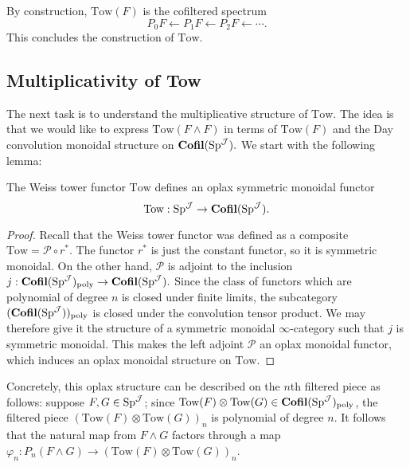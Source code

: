 \begin{cnstr}
By construction, $\text{Tow}(F)$ is the cofiltered spectrum $$P_0 F\longleftarrow P_1 F \longleftarrow P_2 F \longleftarrow \cdots .$$  This concludes the construction of $\text{Tow}.$
\end{cnstr}

\subsection{Multiplicativity of Tow}
The next task is to understand the multiplicative structure of $\text{Tow}$.  The idea is that we would like to express $\text{Tow}(F\wedge F)$ in terms of $\text{Tow}(F)$ and the Day convolution monoidal structure on $\operatorname{\mathbf{Cofil}}(\operatorname{\mathrm{Sp}}^{\operatorname{\mathcal{J}}}).$  We start with the following lemma:  

\begin{lem}
The Weiss tower functor $\text{Tow}$ defines an oplax symmetric monoidal functor $$\text{Tow}: \operatorname{\mathrm{Sp}}^{\operatorname{\mathcal{J}}} \to \operatorname{\mathbf{Cofil}}(\operatorname{\mathrm{Sp}}^{\operatorname{\mathcal{J}}}).$$
\end{lem}
\begin{proof}
Recall that the Weiss tower functor was defined as a composite $\text{Tow} = \mathcal{P} \circ r^*.$  The functor $r^*$ is just the constant functor, so it is symmetric monoidal.  On the other hand, $\mathcal{P}$ is adjoint to the inclusion $j: \operatorname{\mathbf{Cofil}}(\operatorname{\mathrm{Sp}}^{\operatorname{\mathcal{J}}})_{\text{poly}} \to \operatorname{\mathbf{Cofil}}(\operatorname{\mathrm{Sp}}^{\operatorname{\mathcal{J}}}).$  Since the class of functors which are polynomial of degree $n$ is closed under finite limits, the subcategory $(\operatorname{\mathbf{Cofil}}(\operatorname{\mathrm{Sp}}^{\operatorname{\mathcal{J}}}))_{\text{poly}}$ is closed under the convolution tensor product.  We may therefore give it the structure of a symmetric monoidal $\infty$-category such that $j$ is symmetric monoidal.  This makes the left adjoint $\mathcal{P}$ an oplax monoidal functor, which induces an oplax monoidal structure on $\text{Tow}.$  \end{proof}

Concretely, this oplax structure can be described on the $n$th filtered piece as follows: suppose $F,G \in \operatorname{\mathrm{Sp}}^{\operatorname{\mathcal{J}}}$; since $\text{Tow}(F) \otimes \text{Tow}(G) \in  \operatorname{\mathbf{Cofil}}(\operatorname{\mathrm{Sp}}^{\operatorname{\mathcal{J}}})_{\text{poly}}$, the filtered piece $(\text{Tow}(F) \otimes \text{Tow}(G))_n$ is polynomial of degree $n$.  It follows that the natural map from $F\wedge G$ factors through a map $\varphi_n: P_n(F\wedge G)\to (\text{Tow}(F) \otimes \text{Tow}(G))_n$.  

